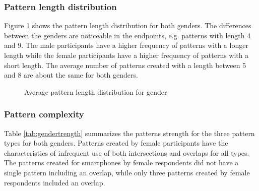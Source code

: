     \subsubsection{Pattern length distribution}
    Figure \ref{fig:avgpatterndistgender} shows the pattern length distribution for both genders. The differences between the genders are noticeable in the endpoints, e.g. patterns with length 4 and 9. The male participants have a higher frequency of patterns with a longer length while the female participants have a higher frequency of patterns with a short length. The average number of patterns created with a length between 5 and 8 are about the same for both genders. 

    \begin{figure}[H]
    	\centering
    	\caption{Average pattern length distribution for gender}
    	\label{fig:avgpatterndistgender}
    \end{figure}

    \subsubsection{Pattern complexity}
    Table \ref{tab:gendertrength} summarizes the patterns strength for the three pattern types for both genders. Patterns created by female participants have the characteristics of infrequent use of both intersections and overlaps for all types. The patterns created for  smartphones by female respondents did not have a single pattern including an overlap, while only three patterns created by female respondents included an overlap.

